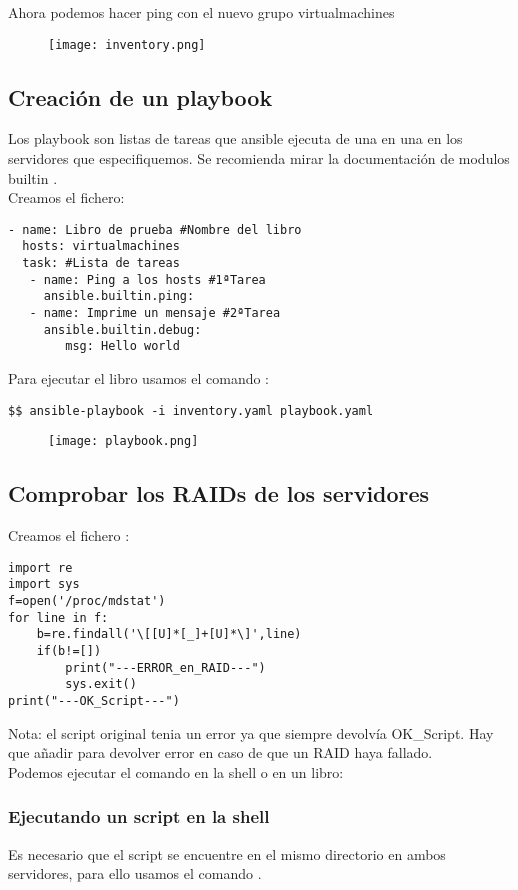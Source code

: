 Ahora podemos hacer ping con el nuevo grupo virtualmachines
\begin{figure}[H]
	\centering
	\texttt{[image: inventory.png]} 
\end{figure}

\subsection{Creación de un playbook}
Los playbook son listas de tareas que ansible ejecuta de una en una en los servidores que especifiquemos. Se recomienda mirar la documentación de modulos builtin \cite{ansiblebuiltin}.
\\Creamos el fichero: 
\begin{verbatim}
- name: Libro de prueba #Nombre del libro
  hosts: virtualmachines
  task: #Lista de tareas
   - name: Ping a los hosts #1ªTarea
     ansible.builtin.ping:
   - name: Imprime un mensaje #2ªTarea
     ansible.builtin.debug:
        msg: Hello world
\end{verbatim}

Para ejecutar el libro usamos el comando :
\begin{verbatim}
$$ ansible-playbook -i inventory.yaml playbook.yaml
\end{verbatim}
\begin{figure}[H]
	\centering
	\texttt{[image: playbook.png]} 
\end{figure}

\subsection{Comprobar los RAIDs de los servidores}
Creamos el fichero :
\begin{verbatim}
import re
import sys
f=open('/proc/mdstat')
for line in f:
    b=re.findall('\[[U]*[_]+[U]*\]',line)
    if(b!=[])
        print("---ERROR_en_RAID---")
        sys.exit()
print("---OK_Script---")
\end{verbatim}
Nota: el script original tenia un error ya que siempre devolvía OK\_Script. Hay que añadir  para devolver error en caso de que un RAID haya fallado. \\

Podemos ejecutar el comando en la shell o en un libro:
\subsubsection{Ejecutando un script en la shell}
Es necesario que el script se encuentre en el mismo directorio en ambos servidores, para ello usamos el comando .


